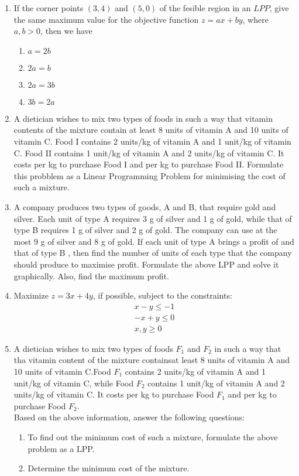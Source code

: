 \begin{enumerate}
\item If the corner points $(3, 4)$ and $(5, 0)$ of the fesible region in an $LPP$, give the same maximum value for the objective function $z = ax + by$, where $a, b > 0$, then we have
\begin{enumerate}
\item $a = 2b$
\item $2a = b$
\item $2a = 3b$
\item $3b = 2a$
\end{enumerate}

\item A dietician wishes to mix two types of foods in such a way that vitamin contents of the mixture contain at least 8 units of vitamin A and 10 units of vitamin C. Food I contains 2 units/kg of vitamin A and 1 unit/kg of vitamin C. Food II contains 1 unit/kg of vitamin A and 2 units/kg of vitamin C. It costs  per kg to purchase Food I and  per kg to purchase Food II. Formulate this probblem as a Linear Programming Problem for minimising the cost of such a mixture.

\item A company produces two types of goods, A and B, that require gold and silver. Each unit of type A requires 3 g of silver and 1 g of gold, while that of type B requires 1 g of silver and 2 g of gold. The company can use at the most 9 g of silver and 8 g of gold. If each unit of type A brings a profit of  and that of type B , then find the number of units of each type that the company should produce to maximise profit. 
Formulate the above LPP and solve it graphically. Also, find the maximum profit.

\item Maximize $z = 3x + 4y$, if possible,
	subject to the constraints:
		\begin{align}
			x - y \leq -1 \\
			-x + y \leq 0 \\
			x, y \geq 0
		\end{align}

\item A dietician wishes to mix two types of foods $F_1$ and $F_2$ in such a way that tha vitamin content of the mixture containsat least 8 units of vitamin A and 10 units of vitamin C.Food $F_1$ contains 2 units/kg of vitamin A and 1 unit/kg of vitamin C, while Food $F_2$ contains 1 unit/kg of vitamin A and 2 units/kg of vitamin C. It costs  per kg to purchase Food $F_1$ and  per kg to purchase Food $F_2$.\\
Based on the above information, answer the following questions:
\begin{enumerate}
	\item To find out the minimum cost of such a mixture, formulate the above problem as a LPP.
	\item Determine the minimum cost of the mixture.
\end{enumerate}

\end{enumerate}
